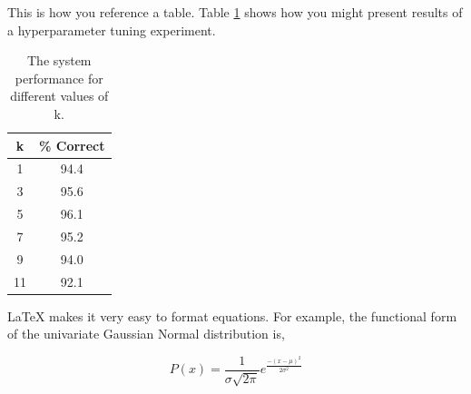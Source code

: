 \documentclass[a4paper]{article}
\begin{document}
This is how you reference a table. Table \ref{tab:example} shows how you might present results of a hyperparameter tuning experiment.
\begin{table}[th]
    \caption{The system performance for different values of k.}
    \label{tab:example}
    \centering
    \begin{tabular}{ c|c}
      \toprule
      k & \% Correct\\
      \midrule
       1 & 94.4 \\
       3 & 95.6 \\
       5 & 96.1 \\
       7 & 95.2 \\
       9 & 94.0 \\
       11 & 92.1 \\
      \bottomrule
    \end{tabular}

  \end{table}

  LaTeX makes it very easy to format equations. For example, the functional form of the univariate Gaussian Normal distribution is,

  \begin{equation}
P(x) = \frac{1}{\sigma \sqrt {2\pi } }e^{\frac{ - \left( {x - \mu } \right)^2 }{2\sigma^2}}
\label{eq:gaussian}
  \end{equation}





\end{document}
